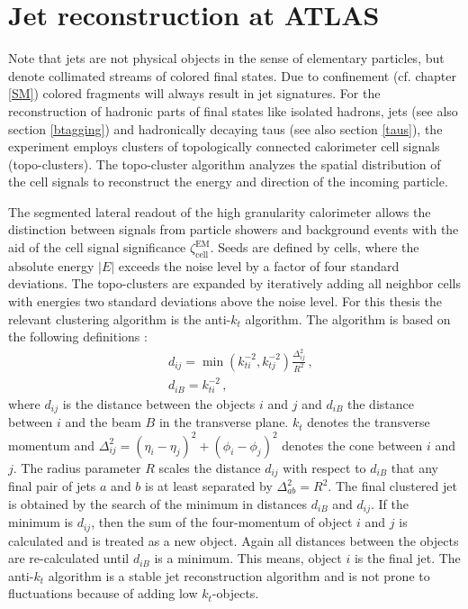 \section{Jet reconstruction at ATLAS}\label{jets}
Note that jets are not physical objects in the sense of elementary particles, but denote collimated streams of colored final states. Due to confinement (cf. chapter \ref{SM}) colored fragments will always result in jet signatures. \cite{PhysTeV}\newline  
For the reconstruction of hadronic parts of final states like isolated hadrons, jets (see also section \ref{btagging}) and hadronically decaying taus (see also section \ref{taus}), the {\ATLAS} experiment employs clusters of topologically connected calorimeter cell signals (topo-clusters). The topo-cluster algorithm analyzes the spatial distribution of the cell signals to reconstruct the energy and direction of the incoming particle. \cite{topo}\par
The segmented lateral readout of the high granularity calorimeter allows the distinction between signals from particle showers and background events with the aid of the cell signal significance $\zeta_\text{cell}^\text{EM}$. \cite{topo} Seeds are defined by cells, where the absolute energy $|E|$ exceeds the noise level by a factor of four standard deviations. The topo-clusters are expanded by iteratively adding all neighbor cells with energies two standard deviations above the noise level. \cite{jetPerformance}\newline
For this thesis the relevant clustering algorithm is the anti-$k_t$ algorithm. The algorithm is based on the following definitions \cite{antikt}:
\begin{align}
                        &d_{ij}=\min(k_{ti}^{-2},k_{tj}^{-2})\frac{\Delta_{ij}^2}{R^2}\,\text{,}\\
                        &d_{iB}=k_{ti}^{-2}\,\text{,}
\label{antiktalgorithm}
\end{align}
where $d_{ij}$ is the distance between the objects $i$ and $j$ and $d_{iB}$ the distance between $i$ and the beam $B$ in the transverse plane. $k_t$ denotes the transverse momentum and $\Delta_{ij}^2=(\eta_i-\eta_j)^2+(\phi_i-\phi_j)^2$ denotes the cone between $i$ and $j$. The radius parameter $R$ scales the distance $d_{ij}$ with respect to $d_{iB}$ that any final pair of jets $a$ and $b$ is at least separated by $\Delta^2_{ab}=R^2$. The final clustered jet is obtained by the search of the minimum in distances $d_{iB}$ and $d_{ij}$. If the minimum is $d_{ij}$, then the sum of the four-momentum of object $i$ and $j$ is calculated and is treated as a new object. Again all distances between the objects are re-calculated until $d_{iB}$ is a minimum. This means, object $i$ is the final jet. The anti-$k_t$ algorithm is a stable jet reconstruction algorithm and is not prone to fluctuations because of adding low $k_t$-objects. \cite{antikt}
%
%
